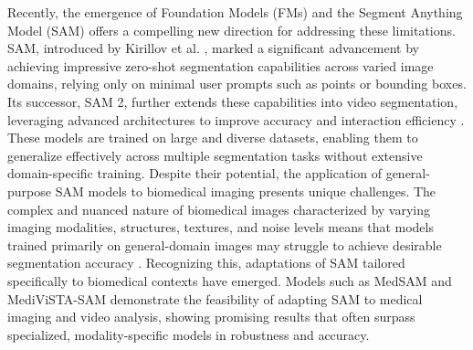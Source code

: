 \documentclass[./dissertation.tex]{subfiles}
\begin{document}
Recently, the emergence of Foundation Models (FMs) and the Segment Anything Model (SAM) offers a compelling new direction for addressing these limitations. SAM, introduced by Kirillov et al. \cite{kirillov2023segment}, marked a significant advancement by achieving impressive zero-shot segmentation capabilities across varied image domains, relying only on minimal user prompts such as points or bounding boxes. Its successor, SAM 2, further extends these capabilities into video segmentation, leveraging advanced architectures to improve accuracy and interaction efficiency \cite{ravi2024sam}. These models are trained on large and diverse datasets, enabling them to generalize effectively across multiple segmentation tasks without extensive domain-specific training. Despite their potential, the application of general-purpose SAM models to biomedical imaging presents unique challenges. The complex and nuanced nature of biomedical images characterized by varying imaging modalities, structures, textures, and noise levels means that models trained primarily on general-domain images may struggle to achieve desirable segmentation accuracy \cite{mazurowski2023segment,na2024segment}. Recognizing this, adaptations of SAM tailored specifically to biomedical contexts have emerged. Models such as MedSAM \cite{ma2024segment} and MediViSTA-SAM \cite{kim2025medivista} demonstrate the feasibility of adapting SAM to medical imaging and video analysis, showing promising results that often surpass specialized, modality-specific models in robustness and accuracy.




\end{document}
